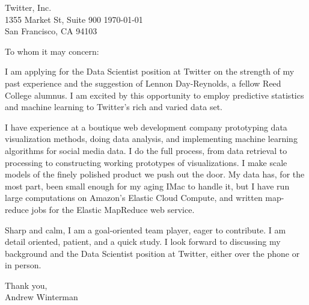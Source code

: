 \documentclass[11pt]{letter}
\date{}
\begin{document}
\begin{letter}{Twitter, Inc. \\
1355 Market St, Suite 900
 \hfill \today \\
San Francisco, CA 94103\\ 
}
\address{}

\begin{adjustwidth}{1in}{1in}

    \opening{To whom it may concern:}

    \thispagestyle{fancy}
I am applying for the Data Scientist position at Twitter on the strength of my
past experience and the suggestion of Lennon Day-Reynolds, a fellow Reed
College alumnus. I am excited by this opportunity to employ predictive
statistics and machine learning to Twitter's rich and varied data set.

I have experience at a boutique web development company prototyping data
visualization methods, doing data analysis, and implementing machine learning
algorithms for social media data. I do the full process, from data retrieval to
processing to constructing working prototypes of visualizations. I make scale
models of the finely polished product we push out the door. My data has, for
the most part, been small enough for my aging IMac to handle it, but I have run
large computations on Amazon's Elastic Cloud Compute, and written map-reduce
jobs for the Elastic MapReduce web service.

 Sharp and calm, I am a goal-oriented team player, eager to contribute. I am
 detail oriented, patient, and a quick study. I look forward to discussing my
 background and the Data Scientist position at Twitter, either over the phone
 or in person.

\closing{
Thank you, \\
Andrew Winterman}


\end{adjustwidth}


\end{letter}
\end{document}
